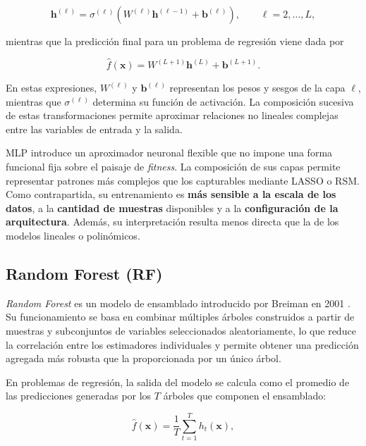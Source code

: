 \begin{equation}
    \mathbf{h}^{(\ell)}
    =
    \sigma^{(\ell)}
    \left(
    W^{(\ell)}\mathbf{h}^{(\ell-1)}
    +
    \mathbf{b}^{(\ell)}
    \right),
    \qquad
    \ell = 2,\dots,L,
\end{equation}

mientras que la predicción final para un problema de regresión viene dada por

\begin{equation}
    \hat{f}(\mathbf{x})
    =
    W^{(L+1)}
    \mathbf{h}^{(L)}
    +
    \mathbf{b}^{(L+1)}.
\end{equation}

En estas expresiones, \(W^{(\ell)}\) y \(\mathbf{b}^{(\ell)}\) representan los pesos y sesgos de la capa \(\ell\), mientras que \(\sigma^{(\ell)}\) determina su función de activación. La composición sucesiva de estas transformaciones permite aproximar relaciones no lineales complejas entre las variables de entrada y la salida.

MLP introduce un aproximador neuronal flexible que no impone una forma funcional fija sobre el paisaje de \textit{fitness}. La composición de sus capas permite representar patrones más complejos que los capturables mediante LASSO o RSM.  Como contrapartida, su entrenamiento es \textbf{más sensible a la escala de los datos}, a la \textbf{cantidad de muestras} disponibles y a la \textbf{configuración de la arquitectura}. Además, su interpretación resulta menos directa que la de los modelos lineales o polinómicos.

\subsection{Random Forest (RF)}

\textit{Random Forest} es un modelo de ensamblado introducido por Breiman en 2001 \cite{breiman2001random}. Su funcionamiento se basa en combinar múltiples árboles construidos a partir de muestras y subconjuntos de variables seleccionados aleatoriamente, lo que reduce la correlación entre los estimadores individuales y permite obtener una predicción agregada más robusta que la proporcionada por un único árbol.

En problemas de regresión, la salida del modelo se calcula como el promedio de las predicciones generadas por los \(T\) árboles que componen el ensamblado:

\begin{equation}
    \hat{f}(\mathbf{x})
    =
    \frac{1}{T}
    \sum_{t=1}^{T}
    h_t(\mathbf{x}),
\end{equation}

